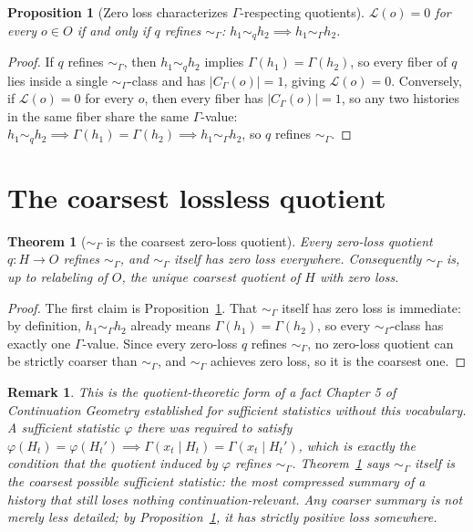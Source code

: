 \documentclass[11pt]{report}
\newtheorem{proposition}{Proposition}[chapter]
\newtheorem{theorem}{Theorem}[chapter]
\newtheorem{remark}{Remark}[chapter]
\begin{document}
\begin{proposition}[Zero loss characterizes $\Gamma$-respecting quotients]
\label{prop:zeroloss}
$\mathcal{L}(o) = 0$ for every $o \in O$ if and only if $q$ refines
$\sim_\Gamma$: $h_1 \sim_q h_2 \implies h_1 \sim_\Gamma h_2$.
\end{proposition}
\begin{proof}
If $q$ refines $\sim_\Gamma$, then $h_1 \sim_q h_2$ implies
$\Gamma(h_1) = \Gamma(h_2)$, so every fiber of $q$ lies inside a
single $\sim_\Gamma$-class and has $|C_\Gamma(o)| = 1$, giving
$\mathcal{L}(o) = 0$. Conversely, if $\mathcal{L}(o) = 0$ for every
$o$, then every fiber has $|C_\Gamma(o)| = 1$, so any two histories in
the same fiber share the same $\Gamma$-value: $h_1 \sim_q h_2 \implies
\Gamma(h_1) = \Gamma(h_2) \implies h_1 \sim_\Gamma h_2$, so $q$
refines $\sim_\Gamma$.
\end{proof}

\section*{The coarsest lossless quotient}

\begin{theorem}[$\sim_\Gamma$ is the coarsest zero-loss quotient]
\label{thm:coarsest}
Every zero-loss quotient $q : H \to O$ refines $\sim_\Gamma$, and
$\sim_\Gamma$ itself has zero loss everywhere. Consequently
$\sim_\Gamma$ is, up to relabeling of $O$, the unique coarsest
quotient of $H$ with zero loss.
\end{theorem}
\begin{proof}
The first claim is Proposition~\ref{prop:zeroloss}. That
$\sim_\Gamma$ itself has zero loss is immediate: by definition,
$h_1 \sim_\Gamma h_2$ already means $\Gamma(h_1) = \Gamma(h_2)$, so
every $\sim_\Gamma$-class has exactly one $\Gamma$-value. Since every
zero-loss $q$ refines $\sim_\Gamma$, no zero-loss quotient can be
strictly coarser than $\sim_\Gamma$, and $\sim_\Gamma$ achieves zero
loss, so it is the coarsest one.
\end{proof}

\begin{remark}
This is the quotient-theoretic form of a fact Chapter 5 of
\emph{Continuation Geometry} established for sufficient statistics
without this vocabulary. A sufficient statistic $\varphi$ there was
required to satisfy $\varphi(H_t) = \varphi(H_t') \implies
\Gamma(x_t \mid H_t) = \Gamma(x_t \mid H_t')$, which is exactly the
condition that the quotient induced by $\varphi$ refines
$\sim_\Gamma$. Theorem~\ref{thm:coarsest} says $\sim_\Gamma$ itself is
the coarsest possible sufficient statistic: the most compressed
summary of a history that still loses nothing continuation-relevant.
Any coarser summary is not merely less detailed; by
Proposition~\ref{prop:zeroloss}, it has strictly positive loss
somewhere.
\end{remark}
\end{document}
